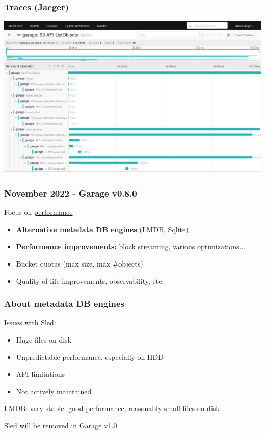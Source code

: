 \documentclass[aspectratio=169]{beamer}
\begin{document}
\begin{frame}
	\frametitle{Traces (Jaeger)}
	\begin{center}
		\includegraphics[width=.8\linewidth]{../assets/jaeger_listobjects.png}
	\end{center}
\end{frame}


\begin{frame}
	\frametitle{November 2022 - Garage v0.8.0}
	Focus on \underline{performance}
	\vspace{2em}
	\begin{itemize}
		\item \textbf{Alternative metadata DB engines} (LMDB, Sqlite)
			\vspace{1em}
		\item \textbf{Performance improvements:} block streaming, various optimizations...
			\vspace{1em}
		\item Bucket quotas (max size, max \#objects)
			\vspace{1em}
		\item Quality of life improvements, observability, etc.
	\end{itemize}
\end{frame}

\begin{frame}
	\frametitle{About metadata DB engines}
	Issues with Sled:
	\vspace{2em}
	\begin{itemize}
		\item Huge files on disk
			\vspace{.5em}
		\item Unpredictable performance, especially on HDD
			\vspace{.5em}
		\item API limitations
			\vspace{.5em}
		\item Not actively maintained
	\end{itemize}
	\vspace{2em}
	LMDB: very stable, good performance, reasonably small files on disk

	\vspace{1em}
	Sled will be removed in Garage v1.0
\end{frame}
\end{document}
